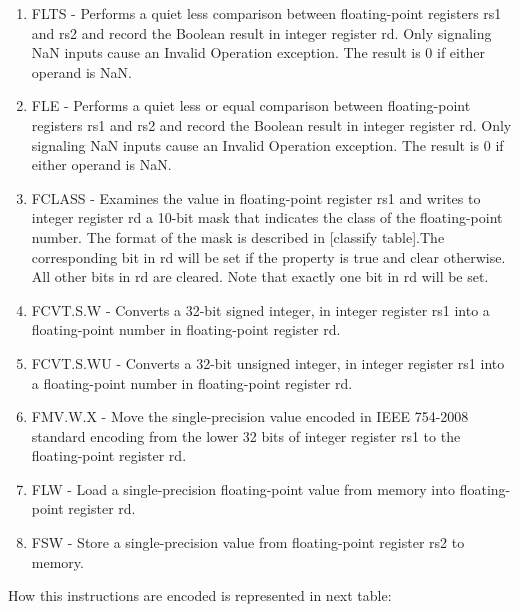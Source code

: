 \documentclass{scrreprt}
\begin{document}
\begin{enumerate}
        \item FLTS - Performs a quiet less comparison between floating-point registers rs1 and rs2 and record the Boolean result in integer register rd. Only signaling NaN inputs cause an Invalid Operation exception. The result is 0 if either operand is NaN.
        \item FLE - Performs a quiet less or equal comparison between floating-point registers rs1 and rs2 and record the Boolean result in integer register rd. Only signaling NaN inputs cause an Invalid Operation exception. The result is 0 if either operand is NaN.
        \item FCLASS - Examines the value in floating-point register rs1 and writes to integer register rd a 10-bit mask that indicates the class of the floating-point number. The format of the mask is described in [classify table].The corresponding bit in rd will be set if the property is true and clear otherwise. All other bits in rd are cleared. Note that exactly one bit in rd will be set.
        \item FCVT.S.W - Converts a 32-bit signed integer, in integer register rs1 into a floating-point number in floating-point register rd.
        \item FCVT.S.WU - Converts a 32-bit unsigned integer, in integer register rs1 into a floating-point number in floating-point register rd.
        \item FMV.W.X - Move the single-precision value encoded in IEEE 754-2008 standard encoding from the lower 32 bits of integer register rs1 to the floating-point register rd.
        \item FLW - Load a single-precision floating-point value from memory into floating-point register rd.
        \item FSW - Store a single-precision value from floating-point register rs2 to memory.
\end{enumerate}
\newpage
How this instructions are encoded is represented in next table:
\end{document}
